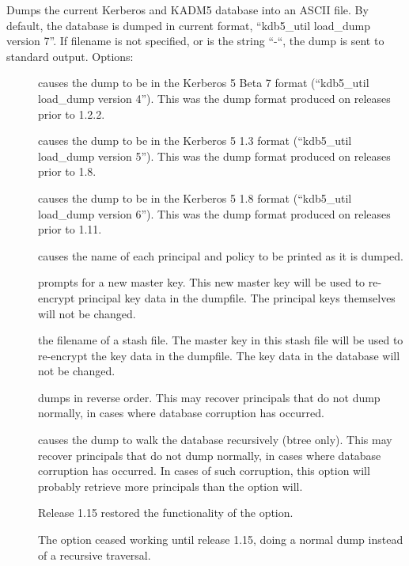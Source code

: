 \documentclass[letterpaper,10pt,english]{sphinxmanual}
\begin{document}
Dumps the current Kerberos and KADM5 database into an ASCII file.  By
default, the database is dumped in current format, “kdb5\_util
load\_dump version 7”.  If filename is not specified, or is the string
“-“, the dump is sent to standard output.  Options:
\begin{description}
\item[{}] \leavevmode
causes the dump to be in the Kerberos 5 Beta 7 format (“kdb5\_util
load\_dump version 4”).  This was the dump format produced on
releases prior to 1.2.2.

\item[{}] \leavevmode
causes the dump to be in the Kerberos 5 1.3 format (“kdb5\_util
load\_dump version 5”).  This was the dump format produced on
releases prior to 1.8.

\item[{}] \leavevmode
causes the dump to be in the Kerberos 5 1.8 format (“kdb5\_util
load\_dump version 6”).  This was the dump format produced on
releases prior to 1.11.

\item[{}] \leavevmode
causes the name of each principal and policy to be printed as it
is dumped.

\item[{}] \leavevmode
prompts for a new master key.  This new master key will be used to
re-encrypt principal key data in the dumpfile.  The principal keys
themselves will not be changed.

\item[{ }] \leavevmode
the filename of a stash file.  The master key in this stash file
will be used to re-encrypt the key data in the dumpfile.  The key
data in the database will not be changed.

\item[{}] \leavevmode
dumps in reverse order.  This may recover principals that do not
dump normally, in cases where database corruption has occurred.

\item[{}] \leavevmode
causes the dump to walk the database recursively (btree only).
This may recover principals that do not dump normally, in cases
where database corruption has occurred.  In cases of such
corruption, this option will probably retrieve more principals
than the  option will.

Release 1.15 restored the functionality of the 
option.

The  option ceased working until release 1.15,
doing a normal dump instead of a recursive traversal.

\end{description}
\end{document}
